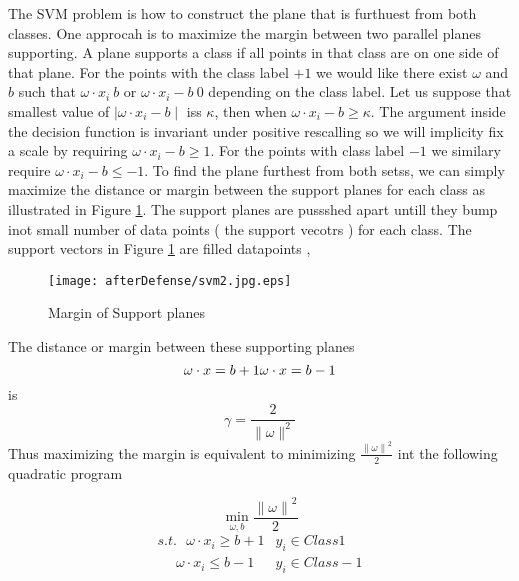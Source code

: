 The SVM problem is how to construct the plane that is furthuest from both classes. One approcah is to maximize the margin between two parallel planes supporting. A plane supports a class if all points in that class are on one side of that plane. For the points with the class label $+1$ we would like there exist $\omega$ and $b$ such that $\omega \cdot x_i\> b$ or $\omega \cdot x_i -b \> 0$  depending on the class label. Let us suppose that smallest value of $\mid \omega \cdot x_i -b\mid$ iss $\kappa$, then when $ \omega \cdot x_i -b \geq \kappa$. The argument inside the decision function is invariant under positive rescalling so we will implicity fix a scale by requiring $\omega \cdot x_i -b \geq 1 $. For the points with class label $-1$ we similary require $\omega \cdot x_i -b \leq -1 $. To find the plane furthest from both setss, we can simply maximize the distance or margin between the support planes for each class as illustrated in Figure \ref{fig:svm2}. The support planes are pussshed apart untill they bump inot small number of data points ( the support vecotrs ) for each class. The support vectors in Figure \ref{fig:svm2} are filled datapoints , 
\begin{figure}
	\centering
		\texttt{[image: afterDefense/svm2.jpg.eps]}
	\caption{Margin of Support planes }
	\label{fig:svm2}
\end{figure}


The distance or margin between these supporting planes 
\begin{equation}
 \omega \cdot x=b+1 \\
  \omega \cdot x=b-1
\end{equation}
is 
\begin{equation}
 \gamma = \frac{2}{\parallel \omega \parallel^2}
\end{equation}
Thus maximizing the margin is equivalent to minimizing $\frac{{\parallel \omega \parallel}^2}{2}$ int the following quadratic program 


\begin{equation}
 \min_{\omega,b}  \frac{{\parallel \omega \parallel}^2}{2}
\end{equation}
\begin{equation}	
\begin{array}{cc}
 s.t. \ \ \   \omega \cdot x_i \geq b+1 &    y_i \in Class 1 \\ 
 \ \ \ \ \ \   \omega \cdot x_i \leq b-1 &    y_i \in Class -1 
  \end{array} 
\end{equation}


